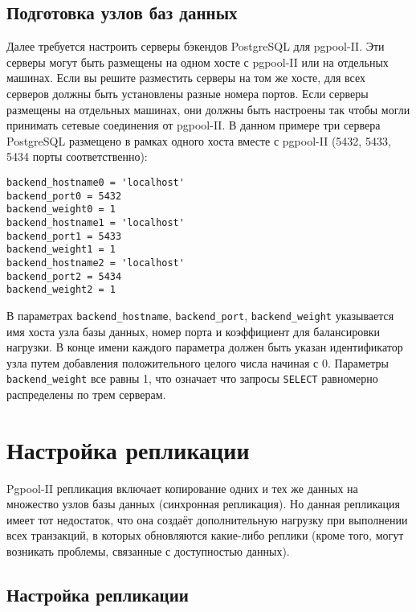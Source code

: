 \subsection{Подготовка узлов баз данных}

Далее требуется настроить серверы бэкендов PostgreSQL для pgpool-II. Эти серверы могут быть размещены на одном хосте с pgpool-II или на отдельных машинах. Если вы решите разместить серверы на том же хосте, для всех серверов должны быть установлены разные номера портов. Если серверы размещены на отдельных машинах, они должны быть настроены так чтобы могли принимать сетевые соединения от pgpool-II. В данном примере три сервера PostgreSQL размещено в рамках одного хоста вместе с pgpool-II (5432, 5433, 5434 порты соответственно):

\begin{lstlisting}[label=lst:pgpool10,caption=Подготовка узлов баз данных]
backend_hostname0 = 'localhost'
backend_port0 = 5432
backend_weight0 = 1
backend_hostname1 = 'localhost'
backend_port1 = 5433
backend_weight1 = 1
backend_hostname2 = 'localhost'
backend_port2 = 5434
backend_weight2 = 1
\end{lstlisting}

В параметрах \lstinline!backend_hostname!, \lstinline!backend_port!, \lstinline!backend_weight! указывается имя хоста узла базы данных, номер порта и коэффициент для балансировки нагрузки. В конце имени каждого параметра должен быть указан идентификатор узла путем добавления положительного целого числа начиная с 0. Параметры \lstinline!backend_weight! все равны 1, что означает что запросы \lstinline!SELECT! равномерно распределены по трем серверам.




\section{Настройка репликации}

Pgpool-II репликация включает копирование одних и тех же данных на множество узлов базы данных (синхронная репликация). Но данная репликация имеет тот недостаток, что она создаёт дополнительную нагрузку при выполнении всех транзакций, в которых обновляются какие-либо реплики (кроме того, могут возникать проблемы, связанные с доступностью данных).

\subsection{Настройка репликации}

